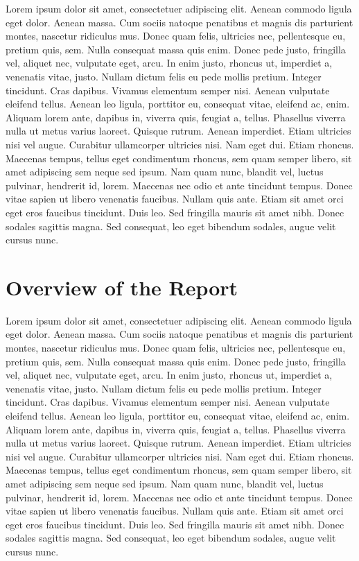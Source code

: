 Lorem ipsum dolor sit amet, consectetuer adipiscing elit. Aenean commodo ligula eget dolor. Aenean massa. Cum sociis natoque penatibus et magnis dis parturient montes, nascetur ridiculus mus. Donec quam felis, ultricies nec, pellentesque eu, pretium quis, sem. Nulla consequat massa quis enim. Donec pede justo, fringilla vel, aliquet nec, vulputate eget, arcu. In enim justo, rhoncus ut, imperdiet a, venenatis vitae, justo. Nullam dictum felis eu pede mollis pretium. Integer tincidunt. Cras dapibus. Vivamus elementum semper nisi. Aenean vulputate eleifend tellus. Aenean leo ligula, porttitor eu, consequat vitae, eleifend ac, enim. Aliquam lorem ante, dapibus in, viverra quis, feugiat a, tellus. Phasellus viverra nulla ut metus varius laoreet. Quisque rutrum. Aenean imperdiet. Etiam ultricies nisi vel augue. Curabitur ullamcorper ultricies nisi. Nam eget dui. Etiam rhoncus. Maecenas tempus, tellus eget condimentum rhoncus, sem quam semper libero, sit amet adipiscing sem neque sed ipsum. Nam quam nunc, blandit vel, luctus pulvinar, hendrerit id, lorem. Maecenas nec odio et ante tincidunt tempus. Donec vitae sapien ut libero venenatis faucibus. Nullam quis ante. Etiam sit amet orci eget eros faucibus tincidunt. Duis leo. Sed fringilla mauris sit amet nibh. Donec sodales sagittis magna. Sed consequat, leo eget bibendum sodales, augue velit cursus nunc.

\section{Overview of the Report}

Lorem ipsum dolor sit amet, consectetuer adipiscing elit. Aenean commodo ligula eget dolor. Aenean massa. Cum sociis natoque penatibus et magnis dis parturient montes, nascetur ridiculus mus. Donec quam felis, ultricies nec, pellentesque eu, pretium quis, sem. Nulla consequat massa quis enim. Donec pede justo, fringilla vel, aliquet nec, vulputate eget, arcu. In enim justo, rhoncus ut, imperdiet a, venenatis vitae, justo. Nullam dictum felis eu pede mollis pretium. Integer tincidunt. Cras dapibus. Vivamus elementum semper nisi. Aenean vulputate eleifend tellus. Aenean leo ligula, porttitor eu, consequat vitae, eleifend ac, enim. Aliquam lorem ante, dapibus in, viverra quis, feugiat a, tellus. Phasellus viverra nulla ut metus varius laoreet. Quisque rutrum. Aenean imperdiet. Etiam ultricies nisi vel augue. Curabitur ullamcorper ultricies nisi. Nam eget dui. Etiam rhoncus. Maecenas tempus, tellus eget condimentum rhoncus, sem quam semper libero, sit amet adipiscing sem neque sed ipsum. Nam quam nunc, blandit vel, luctus pulvinar, hendrerit id, lorem. Maecenas nec odio et ante tincidunt tempus. Donec vitae sapien ut libero venenatis faucibus. Nullam quis ante. Etiam sit amet orci eget eros faucibus tincidunt. Duis leo. Sed fringilla mauris sit amet nibh. Donec sodales sagittis magna. Sed consequat, leo eget bibendum sodales, augue velit cursus nunc.
